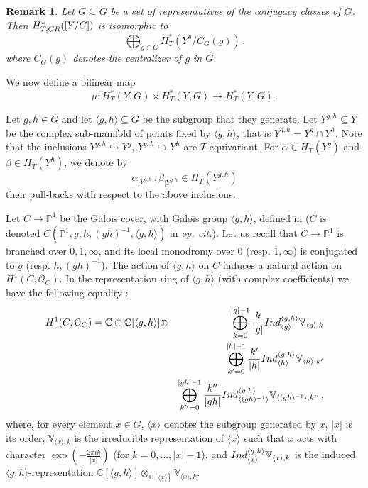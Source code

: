 \documentclass[10pt,a4paper]{amsart}
\newtheorem{rmk}[thm]{Remark}
\newcommand{\C}{\mathbb{C}}
\newcommand{\pr}{\mathbb{P}}   %
\newcommand{\cO}{\mathcal{O}} %
\newcommand{\1}{\mathds{1}}   %
\begin{document}
\begin{rmk}\label{rmkTCR}
Let $\overline{G} \subseteq G$ be a set of representatives of the conjugacy classes of $G$.
Then $H^\ast_{T, {\rm CR}}([Y/G])$ is isomorphic to
$$
\bigoplus_{g\in \overline{G}} H_T^\ast\left(Y^g/C_G(g)\right) \, .
$$ 
where $C_G(g)$ denotes the centralizer of $g$ in $G$.
\end{rmk}

We  now define a bilinear map 
$$
\mu \colon H^*_T(Y, G) \times H^*_T(Y, G) \to H^*_T(Y, G) \, .
$$

Let $g, h \in G$ and let $\langle g, h\rangle \subseteq G$ be the subgroup that they generate.
Let $Y^{g,h} \subseteq Y$ be the complex sub-manifold of points fixed by $\langle g, h\rangle$, that is $Y^{g,h}=Y^g\cap Y^h$.
Note that the inclusions $Y^{g,h} \hookrightarrow Y^g$, $Y^{g,h} \hookrightarrow Y^h$ are $T$-equivariant.
For  $\alpha \in H_T(Y^g)$ and $\beta \in H_T(Y^h)$, we denote by 
$$
\alpha_{|Y^{g,h}} \, , \beta_{|Y^{g,h}} \in H_T(Y^{g,h})
$$
their pull-backs with respect to the above inclusions.

Let $C\to \pr^1$ be the Galois cover, with Galois group $\langle g, h\rangle$, defined in \cite[Appendix]{FG03}
($C$ is denoted $C(\pr^1, g, h, (gh)^{-1}, \langle g, h\rangle)$ in \textit{op. cit.}).
Let us recall that $C\to \pr^1$ is branched over $0, 1, \infty$, and its local monodromy over $0$
(resp. $1, \infty$) is conjugated to $g$ (resp. $h, (gh)^{-1}$). The action of $\langle g, h\rangle$ on $C$ induces a natural action 
on $H^1(C, \cO_C)$. In the  representation ring of $\langle g, h\rangle$ (with complex coefficients) 
we have the following equality \cite[Lemma 8.5]{JKK07}:
\begin{eqnarray}\label{l85JKK07}
H^1(C, \cO_C) = \mathbb C \ominus \C[\langle g, h\rangle] &\oplus& 
\bigoplus_{k=0}^{|g|-1}\frac{k}{|g|} {\rm Ind}^{\langle g, h\rangle}_{\langle g \rangle} \mathbb{V}_{\langle g \rangle, k} \\
&& \bigoplus_{k'=0}^{|h|-1}\frac{k'}{|h|} {\rm Ind}^{\langle g, h\rangle}_{\langle h \rangle} \mathbb{V}_{\langle h \rangle, k'} \nonumber \\
&&  \bigoplus_{k''=0}^{|gh|-1}\frac{k''}{|gh|} {\rm Ind}^{\langle g, h\rangle}_{\langle (gh)^{-1} \rangle} \mathbb{V}_{\langle (gh)^{-1} \rangle, k''} \nonumber \, ,
\end{eqnarray}
where, for every element $x \in G$, $\langle x \rangle$ denotes the subgroup generated by $x$, 
$|x|$ is its order,  $\mathbb{V}_{\langle x \rangle, k}$ is the irreducible representation of $\langle x \rangle$
such that $x$ acts with character $\exp \left( -\frac{2\pi i k}{|x|}\right)$ (for $k=0, \ldots , |x|-1$), and 
${\rm Ind}^{\langle g, h\rangle}_{\langle x \rangle} \mathbb{V}_{\langle x \rangle, k} $ is the induced 
$\langle g, h\rangle$-representation 
$\C[\langle g, h\rangle]\otimes_{\C[\langle x \rangle]} \mathbb{V}_{\langle x \rangle, k}$.
\end{document}
